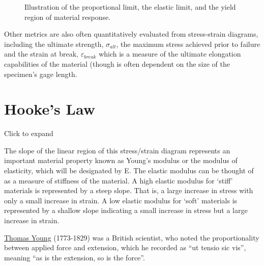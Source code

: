 \documentclass[
  letterpaper,
  DIV=11,
  numbers=noendperiod]{scrreprt}
\theoremstyle{definition}
\theoremstyle{remark}
\begin{document}
\begin{figure}


\caption{\label{fig-4.4}Illustration of the proportional limit, the
elastic limit, and the yield region of material response.}

\end{figure}%

Other metrics are also often quantitatively evaluated from stress-strain
diagrams, including the ultimate strength, \(\sigma_{alt}\), the maximum
stress achieved prior to failure and the strain at break,
\(\varepsilon_{break}\) which is a measure of the ultimate elongation
capabilities of the material (though is often dependent on the size of
the specimen's gage length.

\section{Hooke's Law}\label{sec-4.3}

Click to expand

The slope of the linear region of this stress/strain diagram represents
an important material property known as Young's modulus or the modulus
of elasticity, which will be designated by E. The elastic modulus can be
thought of as a measure of stiffness of the material. A high elastic
modulus for `stiff' materials is represented by a steep slope. That is,
a large increase in stress with only a small increase in strain. A low
elastic modulus for `soft' materials is represented by a shallow slope
indicating a small increase in stress but a large increase in strain.

\href{https://en.wikipedia.org/wiki/Thomas_Young_(scientist)}{Thomas
Young} (1773-1829) was a British scientist, who noted the
proportionality between applied force and extension, which he recorded
as ``ut tensio sic vis'', meaning ``as is the extension, so is the
force''.
\end{document}
